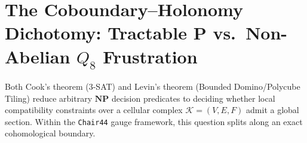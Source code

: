 \documentclass[11pt,a4paper]{article}
\theoremstyle{definition}
\begin{document}
\begin{abstract}
false-positive SAT claims ($\mathrm{FPR}_{\mathrm{pre}} = 0.0\%$ vs.\ $\mathrm{FPR}_{\mathrm{peek}} = 78.36\%$). All theorems are machine-checked in Lean~4 (, $76$ sections, $14{,}527$ lines, $440$ \texttt{\#print axioms} checks) and SymPy/Python ().
\end{abstract}

\section{The Coboundary--Holonomy Dichotomy: Tractable $\mathbf{P}$ vs.\ Non-Abelian $Q_8$ Frustration}

Both Cook's theorem ($3$-SAT) and Levin's theorem (Bounded Domino/Polycube Tiling) reduce arbitrary $\mathbf{NP}$ decision predicates to deciding whether local compatibility constraints over a cellular complex $\mathcal{K} = (V, E, F)$ admit a global section. Within the \texttt{Chair44} gauge framework, this question splits along an exact cohomological boundary.
\end{document}
